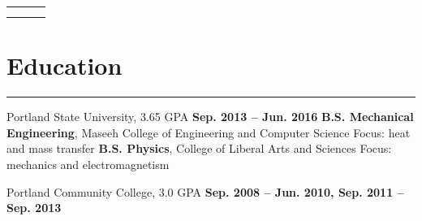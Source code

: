 

\newlength{\rcollength}\setlength{\rcollength}{3.0in}%
\begin{tabular} {
  p{}
  p{}
  p{}}
	\begin{flushleft}
		\address
	\end{flushleft}
	&
	\begin{center}
	\Large{\author}
	\end{center}
	&
	\begin{flushright}
		{\phnum}\\
 	    {\email} 	 
	\end{flushright}
\end{tabular}
\section{Education}
	\noindent\rule{\textwidth}{\hlinewidth}
	\begin{innerlist}
	\item Portland State University, 3.65 GPA	\hfill\textbf{Sep. 2013 -- Jun. 2016}
		\subitem \textbf{B.S. Mechanical Engineering}, Maseeh College of Engineering and Computer Science
		\subsubitem Focus: heat and mass transfer
		\subitem\textbf{B.S. Physics}, College of Liberal Arts and Sciences
		\subsubitem Focus: mechanics and electromagnetism
		\subitem 
	\item Portland Community College, 3.0 GPA	\hfill\textbf{Sep. 2008 -- Jun. 2010, Sep. 2011 -- Sep. 2013}
	\end{innerlist}
\vfill
